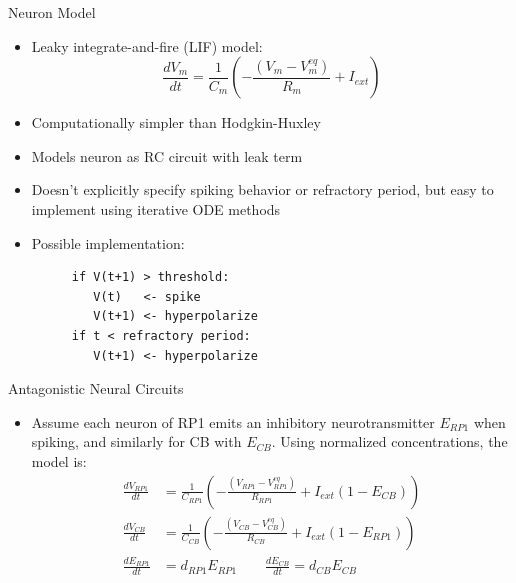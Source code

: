 \documentclass[leqno,presentation,unknownkeysallowed]{beamer}
\begin{document}
\begin{frame}[fragile]{Neuron Model}
\begin{itemize}
\item Leaky integrate-and-fire (LIF) model:
\begin{equation*}
\frac{dV_{m}}{dt}=\frac{1}{C_{m}}\left(-\frac{(V_{m}-V_{m}^{eq})}{R_{m}}+I_{ext}\right)
\end{equation*}
\item Computationally simpler than Hodgkin-Huxley
\item Models neuron as RC circuit with leak term
\item Doesn't explicitly specify spiking behavior or refractory period, but easy to implement using iterative ODE methods
\item Possible implementation:
\begin{figure}
\begin{BVerbatim}[fontsize=\scriptsize]
if V(t+1) > threshold:
   V(t)   <- spike
   V(t+1) <- hyperpolarize
if t < refractory period:
   V(t+1) <- hyperpolarize
\end{BVerbatim}
\end{figure}
\end{itemize}
\end{frame}

\begin{frame}{Antagonistic Neural Circuits}
\begin{itemize}
\item Assume each neuron of RP1 emits an inhibitory neurotransmitter $E_{RP1}$ when spiking, and similarly for CB with $E_{CB}$. Using normalized concentrations, the model is:
\begin{align*}
\frac{dV_{RP1}}{dt}&=\frac{1}{C_{RP1}}\left(-\frac{(V_{RP1}-V_{RP1}^{eq})}{R_{RP1}}+I_{ext}\left(1-E_{CB}\right)\right)\\
\frac{dV_{CB}}{dt}&=\frac{1}{C_{CB}}\left(-\frac{(V_{CB}-V_{CB}^{eq})}{R_{CB}}+I_{ext}\left(1-E_{RP1}\right)\right)\\
\frac{dE_{RP1}}{dt}&=d_{RP1}E_{RP1}\hspace{2em}\frac{dE_{CB}}{dt}=d_{CB}E_{CB}
\end{align*}
\end{itemize}
\end{frame}
\end{document}
